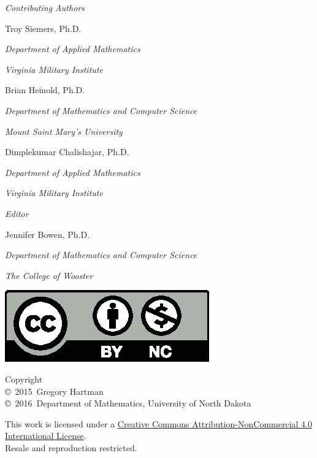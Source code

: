 
\textit{Contributing Authors}

Troy Siemers, Ph.D.

\emph{\small Department of Applied Mathematics}

\emph{\small Virginia Military Institute}\bigskip

Brian Heinold, Ph.D.

\emph{\small Department of Mathematics and Computer Science}

\emph{\small Mount Saint Mary's University}\bigskip

Dimplekumar Chalishajar, Ph.D.

\emph{\small Department of Applied Mathematics}

\emph{\small Virginia Military Institute}\bigskip\medskip

\textit{Editor}

Jennifer Bowen, Ph.D.

\emph{\small Department of Mathematics and Computer Science}

\emph{\small The College of Wooster}


\noindent\hspace{-1in}\begin{minipage}{2in}
\href{http://creativecommons.org/licenses/by-nc/4.0/}{\includegraphics{text/by-nc}}
\end{minipage}%
\begin{minipage}{3in}
\noindent Copyright\\
\copyright~2015~Gregory Hartman\\
\copyright~2016~Department of Mathematics, University of North Dakota

This work is licensed under a \href{http://creativecommons.org/licenses/by-nc/4.0/}{Creative Commons Attribution-NonCommercial 4.0 International License}.\\
Resale and reproduction restricted.
\end{minipage}

